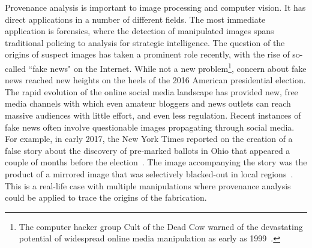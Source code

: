 Provenance analysis is important to image processing and computer vision.
It has direct applications in a number of different fields.
The most immediate application is forensics, where the detection of manipulated images spans traditional policing to analysis for strategic intelligence.
The question of the origins of suspect images has taken a prominent role recently, with the rise of so-called ``fake news" on the Internet. 
While not a new problem\footnote{The computer hacker group Cult of the Dead Cow warned of the devastating potential of widespread online media manipulation as early as 1999~\cite{cdc}.}, concern about fake news reached new heights on the heels of the 2016 American presidential election.
The rapid evolution of the online social media landscape has provided new, free media channels with which even amateur bloggers and news outlets can reach massive audiences with little effort, and even less regulation.
Recent instances of fake news often involve questionable images propagating through social media.
For example, in early 2017, the New York Times reported on the creation of a false story about the discovery of pre-marked ballots in Ohio that appeared a couple of months before the election~\cite{NYT1}.
The image accompanying the story was the product of a mirrored image that was selectively blacked-out in local regions~\cite{PP1}.
This is a real-life case with multiple manipulations where provenance analysis could be applied to trace the origins of the fabrication. 


